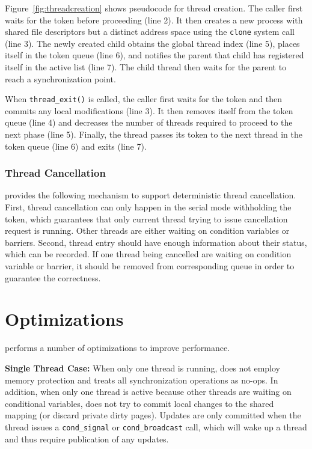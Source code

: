 Figure~\ref{fig:threadcreation} shows pseudocode for thread creation. The caller first waits for the token before proceeding (line 2).  It then creates a new process with shared file descriptors but a distinct address space using the \texttt{clone} system call (line 3).  The newly created child obtains the global thread index (line 5), places itself in the token queue (line 6), and notifies the parent that child has registered itself in the active list (line 7). The child thread then waits for the parent to reach a synchronization point.

When \texttt{thread\_exit()} is called, the caller first waits for the token and then commits any local modifications (line 3). It then removes itself from the token queue (line 4) and decreases the number of threads required to proceed to the next phase (line 5). Finally, the thread passes its token to the next thread in the token queue (line 6) and exits (line 7).

\subsubsection{Thread Cancellation}

\dthreads{} provides the following mechanism to support
deterministic thread cancellation. First, thread cancellation can only
happen in the serial mode withholding the token, which guarantees that
only current thread trying to issue cancellation request is
running. Other threads are either waiting on condition variables or
barriers. Second, thread entry should have enough information about
their status, which can be recorded. If one thread being cancelled are
waiting on condition variable or barrier, it should be removed from
corresponding queue in order to guarantee the correctness.


\section{Optimizations}
\dthreads{} performs a number of optimizations to improve performance.

\textbf{Single Thread Case: }
When only one thread is running, \dthreads{} does not employ memory protection 
and treats all synchronization operations as no-ops.
In addition, when only one thread is active because other threads are waiting on conditional variables, 
\dthreads{} does not try to commit local changes to the shared mapping (or discard  
private dirty pages). Updates are only committed when the thread issues
a \texttt{cond\_signal} or \texttt{cond\_broadcast} call, which
will wake up a thread and thus require publication of any updates.

